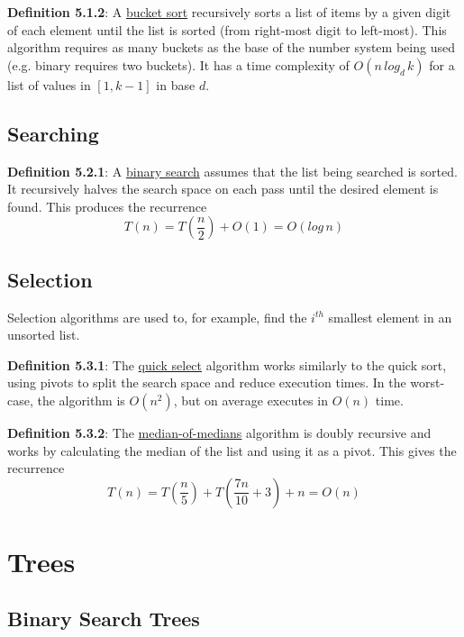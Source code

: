 \documentclass{article}
\newcommand{\separate}[1] {\vspace{#1 pt}\noindent}
\newcommand{\definition}[2]{\textbf{Definition #1}: #2\label{def:#1}}
\begin{document}
\separate{7}\definition{5.1.2}{A \underline{bucket sort} recursively sorts a list of items by a given digit of each element until the list is sorted (from right-most digit to left-most). This algorithm requires as many buckets as the base of the number system being used (e.g. binary requires two buckets).}
It has a time complexity of \(O(n \, log_d \, k)\) for a list of values in \([1,k-1]\) in base \(d\).

\subsection{Searching}

\definition{5.2.1}{A \underline{binary search} assumes that the list being searched is sorted. It recursively halves the search space on each pass until the desired element is found. This produces the recurrence}
\begin{equation}
    T(n) = T\left(\frac{n}{2}\right) + O(1) = O(log \, n)
\end{equation}

\subsection{Selection}

Selection algorithms are used to, for example, find the \(i^{th}\) smallest element in an unsorted list.

\separate{7}\definition{5.3.1}{The \underline{quick select} algorithm works similarly to the quick sort, using pivots to split the search space and reduce execution times.}
In the worst-case, the algorithm is \(O(n^2)\), but on average executes in \(O(n)\) time.

\separate{7}\definition{5.3.2}{The \underline{median-of-medians} algorithm is doubly recursive and works by calculating the median of the list and using it as a pivot.} This gives the recurrence
\begin{equation}
    T(n) = T\left(\frac{n}{5}\right) + T\left(\frac{7n}{10} + 3\right) + n = O(n)
\end{equation}

\section{Trees}

\subsection{Binary Search Trees}
\end{document}
